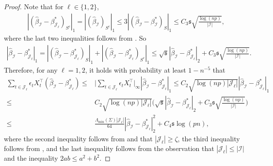 \documentclass[11pt]{article}
\newcommand{\I}{{\mathcal I }}
\newcommand{\J}{{  \mathcal J } }
\newcommand{\s}{ { \mathfrak{s}  } }
\theoremstyle{plain}
\theoremstyle{definition}
\begin{document}
\begin{proof}
Note that for $\ell\in\{1,2\}$, 
\begin{align*} 
 |  ( \widehat \beta _\I  -  \beta _{\J _\ell}^* )_{S^c }  |_1 =  |  ( \widehat \beta _\I )_{S^c}  |_{1} 
   \le 3  |  ( \widehat \beta _\I -\beta _\I ^* )_{S }  |_{1}   \le C_3 \s \sqrt { \frac{ \log(np)}{| \I|} }    , 
\end{align*} 
where the last two inequalities follows from .  So
\begin{align}  \label{eq:regression one change step 2 term 1}
 |   \widehat \beta _\I  -  \beta _{\J_\ell  }^*    |_1 =  |  ( \widehat \beta _\I  -  \beta _{\J_\ell }^* )_{S  }  |_1 +  |  ( \widehat \beta _\I  -  \beta _{\J_\ell }^* )_{S^c }  |_1  \le \sqrt {\s }   |  \widehat \beta _\I  -  \beta _{\J_\ell  }^*    |_2 + C_3 \s \sqrt { \frac{ \log(np)}{| \I|} } .
\end{align} 
Therefore, for any $\ell=1, 2$,
  it holds with probability at least $1 -n^{-5}$ that
\begin{align}  \nonumber  \sum_{ t  \in \J _\ell   } \epsilon_t   X_t ^\top (  \widehat \beta _\I  -  \beta^* _{\J _\ell  }) 
\le 
&
       \bigg| \sum_{ t  \in \J _\ell   } \epsilon_t   X_t ^\top \bigg| _\infty  |   \widehat \beta _\I  -  \beta^* _{\J _\ell  } | _1  
     \le C_2 \sqrt { \log(np)    |\J_\ell | }  |   \widehat \beta _\I  -  \beta _{\J_\ell  }^*    |_1 
     \\\nonumber  
      \le & C_2   \sqrt { \log(np)    |\J_\ell | }   \bigg(   \sqrt {\s }   |  \widehat \beta _\I  -  \beta _{\J_\ell }^*    |_2  +C_3 \s \sqrt { \frac{ \log(np)}{| \I|} }  \bigg) 
      \\
\le  &  \frac{ \Lambda_{\min}(\Sigma)  | \J_ \ell |}{64}  |  \widehat \beta _\I  -  \beta _{\J_\ell }^*    |_2  ^2  + C_4    \s \log(pn),
 \label{eq:regression one change step 2 term 3}
\end{align}
where the  second  inequality follows from  and that  $|\J  _\ell|   \ge \zeta   $, the third inequality follows from , and  the last inequality follows from the observation     that   $ |\J_\ell| \le |\I|   $ and the inequality $2ab \leq a^2 + b^2$.


\end{proof}
\end{document}
